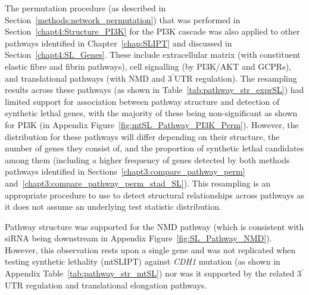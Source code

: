 The permutation procedure (as described in Section~\ref{methods:network_permutation}) that was performed in Section~\ref{chapt4:Structure_PI3K} for the \gls{PI3K} cascade was also applied to other pathways identified in Chapter~\ref{chap:SLIPT} and discussed in Section~\ref{chapt4:SL_Genes}. These include extracellular matrix (with constituent elastic fibre and fibrin pathways), cell signalling (by PI3K/AKT and GCPRs), and translational pathways (with \gls{NMD} and 3$^\prime$\gls{UTR} regulation). The resampling results across these pathways (as shown in Table~\ref{tab:pathway_str_exprSL}) had limited support for association between pathway structure and detection of synthetic lethal genes, with the majority of these being non-significant as shown for PI3K (in Appendix Figure~\ref{fig:mtSL_Pathway_PI3K_Perm}). However, the distribution for these pathways will differ depending on their structure, the number of genes they consist of, and the proportion of synthetic lethal candidates among them (including a higher frequency of genes detected by both methods pathways identified in Sections~\ref{chapt3:compare_pathway_perm} and~\ref{chapt3:compare_pathway_perm_stad_SL}). This resampling is an appropriate procedure to use to detect structural relationships across pathways as it does not assume an underlying test statistic distribution.

Pathway structure was supported for the \gls{NMD} pathway (which is consistent with \gls{siRNA} being downstream in Appendix Figure~\ref{fig:SL_Pathway_NMD}). However, this observation rests upon a single gene and was not replicated when testing synthetic lethality (mtSLIPT) against \textit{CDH1} mutation (as shown in Appendix Table~\ref{tab:pathway_str_mtSL}) nor was it supported by the related 3$^\prime$\gls{UTR} regulation and translational elongation pathways.


